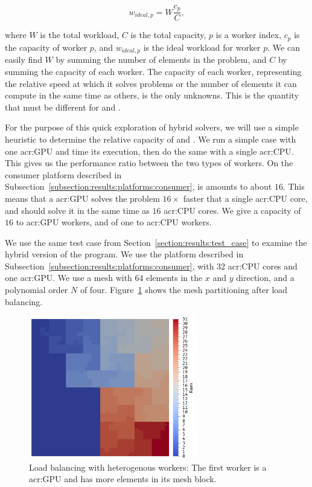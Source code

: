 \begin{equation}
	w_{ideal,p} = W \frac{c_p}{C},
\end{equation}

\noindent
where \(W\) is the total workload, \(C\) is the total capacity, \(p\) is a worker index, \(c_p\) is
the capacity of worker \(p\), and \(w_{ideal,p}\) is the ideal workload for worker \(p\). We can
easily find \(W\) by summing the number of elements in the problem, and \(C\) by summing the
capacity of each worker. The capacity of each worker, representing the relative speed at which it
solves problems or the number of elements it can compute in the same time as others, is the only
unknowns. This is the quantity that must be different for  and
.

For the purpose of this quick exploration of hybrid solvers, we will use a simple heuristic to
determine the relative capacity of  and . We run a simple
case with one \acrshort{acr:GPU} and time its execution, then do the same with a single
\acrshort{acr:CPU}. This gives us the performance ratio between the two types of workers. On the
consumer platform described in Subsection~\ref{subsection:results:platforms:consumer}, is amounts to
about \(16\). This means that a \acrshort{acr:GPU} solves the problem \(16 \times \) faster that a
single \acrshort{acr:CPU} core, and should solve it in the same time as \(16\) \acrshort{acr:CPU}
cores. We give a capacity of \(16\) to \acrshort{acr:GPU} workers, and of one to \acrshort{acr:CPU}
workers.

We use the same test case from Section~\ref{section:results:test_case} to examine the hybrid version
of the program. We use the platform described in
Subsection~\ref{subsection:results:platforms:consumer}, with \(32\) \acrshort{acr:CPU} cores and one
\acrshort{acr:GPU}. We use a mesh with \(64\) elements in the \(x\) and \(y\) direction, and a
polynomial order \(N\) of four. Figure~\ref{fig:hybrid_load_balancing} shows the mesh partitioning
after load balancing.

\begin{figure}[H]
	\centering
	\includegraphics[width=0.65\textwidth]{Chapter_hybrid_solver/media/cpu_gpu}
	\caption{Load balancing with heterogenous workers: The first worker is a \acrshort{acr:GPU} and has more elements in its mesh block.}\label{fig:hybrid_load_balancing}
\end{figure}

